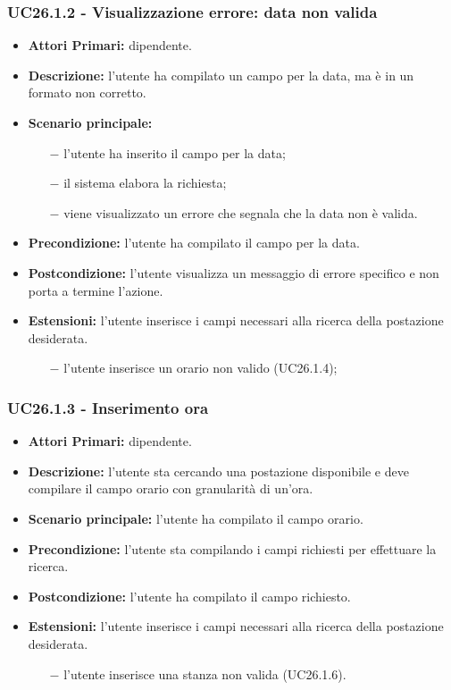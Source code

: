 \subsubsection{ UC26.1.2 - Visualizzazione errore: data non valida  }
\begin{itemize}
	\item\textbf{Attori Primari:} dipendente.
	\item\textbf{Descrizione:} l’utente ha compilato un campo per la data, ma è in un formato non corretto.
	\item\textbf{Scenario principale:} 
	\begin{itemize}
		\item[$-$] l’utente ha inserito il campo per la data;
		\item[$-$] il sistema elabora la richiesta;
		\item[$-$] viene visualizzato un errore che segnala che la data non è valida.
	\end{itemize}
	\item\textbf{Precondizione:} l’utente ha compilato il campo per la data.
	\item\textbf{Postcondizione:} l’utente visualizza un messaggio di errore specifico e non porta a termine l’azione.
	\item\textbf{Estensioni:} l’utente inserisce i campi necessari alla ricerca della postazione desiderata.
	\begin{itemize}
		\item[$-$] l’utente inserisce un orario non valido (UC26.1.4);
	\end{itemize}
\end{itemize}
\subsubsection{ UC26.1.3 - Inserimento ora }
\begin{itemize}
	\item\textbf{Attori Primari:} dipendente.
	\item\textbf{Descrizione:} l’utente sta cercando una postazione disponibile e deve compilare il campo orario con granularità di un'ora.
	\item\textbf{Scenario principale:} l’utente ha compilato il campo orario.
	\item\textbf{Precondizione:} l’utente sta compilando i campi richiesti per effettuare la ricerca.
	\item\textbf{Postcondizione:} l’utente ha compilato il campo richiesto.
	\item\textbf{Estensioni:} l’utente inserisce i campi necessari alla ricerca della postazione desiderata.
	\begin{itemize}
		\item[$-$] l’utente inserisce una stanza non valida (UC26.1.6).
	\end{itemize}
\end{itemize}
